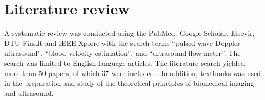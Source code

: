 \section{Literature review}

A systematic review was conducted using the PubMed, Google Scholar, Elsevir, DTU FindIt and IEEE Xplore with the search terms \enquote{pulsed-wave Doppler ultrasound}, \enquote{blood velocity estimation}, and \enquote{ultrasound flow-meter}. The search was limited to English language articles. The literature search yielded more than 50 papers, of which 37 were included \cite{Satomura_CW,Baker1970,Shung1976,Schlindwein1988,Hall_Wall_Filter,Jensen_Analysis_PW_1996,Wells1998,PWDesignParameters,Jansson_Estimation_Perfusion,Hoskins_Review_Blood_Velocity,Fish_Ultrasonic,Jensen_Algorithms,cmut_array_shape,Williams2006,Tsang2009,Matsuoka_Doppler_Rabbit,Hoskins2010,PICpulser,Advances_BloodFlow_Velocity,Overview_Emerging_Imaging,Huang_Smartphone_2012,DesignDocument,Winckler2012,Sagdiev2014,Jacinta_string_phantom,500Vpulser,Wang2016,Govindan2016,Wang2019,JanaSmartphone2020,Ding_PW_Pmut,DingPMUTs,Winder2021,Omura2022,2023_review,Ricci2018,Bessi1995}. In addition, textbooks \cite{JensenUltrasoundBook,ShungUltrasound_Book,Szabo_UltrasoundBook_2} was used in the preparation and study of the theoretical principles of biomedical imaging and ultrasound.

